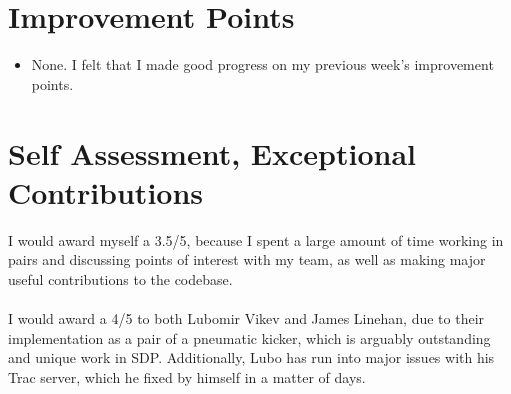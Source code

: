 \documentclass[a4paper,12pt]{article}
\begin{document}

\section{Improvement Points}

\begin{itemize}
\item None. I felt that I made good progress on my previous week's improvement points.
\end{itemize}


\section{Self Assessment, Exceptional Contributions}

I would award myself a 3.5/5, because I spent a large amount of time working in pairs and discussing points of interest with my team, as well as making major useful contributions to the codebase.\\
\\
I would award a 4/5 to both Lubomir Vikev and James Linehan, due to their implementation as a pair of a pneumatic kicker, which is arguably outstanding and unique work in SDP. Additionally, Lubo has run into major issues with his Trac server, which he fixed by himself in a matter of days.


\end{document}
